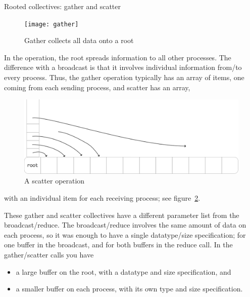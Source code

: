
 {Rooted collectives: gather and scatter}
\label{sec:gatherscatter}

\begin{figure}[ht]
  \texttt{[image: gather]}
  \caption{Gather collects all data onto a root}
  \label{fig:gather}
\end{figure}

In the  operation, the root spreads information to
all other processes. The difference with a broadcast is that it involves
individual information from/to every process. Thus, the gather operation typically 
has an array of items, one coming from each sending process, and scatter has an array,
\begin{figure}[ht]
  \includegraphics[scale=.12]{graphics/scatter-simple}
  \caption{A scatter operation}
  \label{fig:scatter}
\end{figure}
with an individual item for each receiving process; see figure~\ref{fig:scatter}.

These gather and scatter collectives have a different parameter list from
the broadcast/reduce. The broadcast/reduce involves the same amount
of data on each process, so it was enough to have a single
datatype/size specification; for one buffer in the broadcast, and
for both buffers in the reduce call.
In the gather/scatter calls you have
\begin{itemize}
\item a large buffer on the root, with a datatype and size specification, and
\item a smaller buffer on each process, with its own type and size specification.
\end{itemize}

